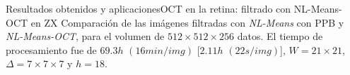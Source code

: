\documentclass[fleqn,10pt]{beamer}
\newcommand\blfootnote[1]{%
	\begingroup
	\renewcommand\thefootnote{}\footnote{#1}%
	\addtocounter{footnote}{-1}%
	\endgroup
}
\begin{document}
\begin{frame}{Resultados obtenidos y aplicaciones}{OCT en la retina: filtrado con NL-Means-OCT en ZX}
	Comparación de las imágenes filtradas con \emph{NL-Means} con PPB y \emph{NL-Means-OCT}, para el volumen de $512\times512\times256$ datos. El tiempo de procesamiento fue de $69.3h$ $(16min/img)$ {\color{violet} [$2.11h$ $(22s/img)$]}, $W=21\times21$, $\Delta = 7\times7\times7$ y $h=18$. 
	\vfill
	
	
	

\end{frame}
\end{document}
